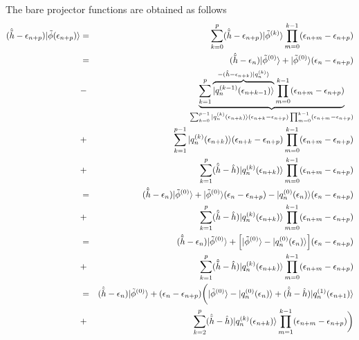 \documentclass[11pt,a4paper]{report}
\begin{document}
The bare projector functions are obtained as follows
\begin{eqnarray}
(\hat{\tilde{h}}-\epsilon_{n+p})
|\tilde{\phi}(\epsilon_{n+p})\rangle
&=&\sum_{k=0}^{p}
(\hat{\tilde{h}}-\epsilon_{n+p})
|\tilde{\phi}^{(k)}\rangle
\prod_{m=0}^{k-1}(\epsilon_{n+m}-\epsilon_{n+p})
\nonumber\\
&=&
(\hat{\tilde{h}}-\epsilon_{n})|\tilde{\phi}^{(0)}\rangle
+|\tilde{\phi}^{(0)}\rangle(\epsilon_n-\epsilon_{n+p})
\nonumber\\
&-&
\underbrace{\sum_{k=1}^{p}
\overbrace{|q_n^{(k-1)}(\epsilon_{n+k-1})\rangle
}^{-(\hat{h}-\epsilon_{n+k})|q_n^{(k)}\rangle}
\prod_{m=0}^{k-1}(\epsilon_{n+m}-\epsilon_{n+p})}
_{
\sum_{k=0}^{p-1}
|q_n^{(k)}(\epsilon_{n+k})\rangle(\epsilon_{n+k}-\epsilon_{n+p})
\prod_{m=0}^{k-1}(\epsilon_{n+m}-\epsilon_{n+p})
}
\nonumber\\
&+&\sum_{k=1}^{p-1}
|q_n^{(k)}(\epsilon_{n+k})\rangle(\epsilon_{n+k}-\epsilon_{n+p})
\prod_{m=0}^{k-1}(\epsilon_{n+m}-\epsilon_{n+p})
\nonumber\\
&+&\sum_{k=1}^{p}
(\hat{\tilde{h}}-\hat{h})
|q_n^{(k)}(\epsilon_{n+k})\rangle
\prod_{m=0}^{k-1}(\epsilon_{n+m}-\epsilon_{n+p})
\nonumber\\
&=&
(\hat{\tilde{h}}-\epsilon_{n})|\tilde{\phi}^{(0)}\rangle
+|\tilde{\phi}^{(0)}\rangle(\epsilon_n-\epsilon_{n+p})
-|q_n^{(0)}(\epsilon_{n})\rangle(\epsilon_{n}-\epsilon_{n+p})
\nonumber\\
&+&\sum_{k=1}^{p}
(\hat{\tilde{h}}-\hat{h})
|q_n^{(k)}(\epsilon_{n+k})\rangle
\prod_{m=0}^{k-1}(\epsilon_{n+m}-\epsilon_{n+p})
\nonumber\\
&=&
(\hat{\tilde{h}}-\epsilon_{n})|\tilde{\phi}^{(0)}\rangle
+
\Bigl[|\tilde{\phi}^{(0)}\rangle-|q_n^{(0)}(\epsilon_{n})\rangle\Bigr]
(\epsilon_n-\epsilon_{n+p})
\nonumber\\
&+&\sum_{k=1}^{p}
(\hat{\tilde{h}}-\hat{h})
|q_n^{(k)}(\epsilon_{n+k})\rangle
\prod_{m=0}^{k-1}(\epsilon_{n+m}-\epsilon_{n+p})
\nonumber\\
&=&
(\hat{\tilde{h}}-\epsilon_{n})|\tilde{\phi}^{(0)}\rangle
+
(\epsilon_n-\epsilon_{n+p})
\biggl(
|\tilde{\phi}^{(0)}\rangle-|q_n^{(0)}(\epsilon_{n})\rangle
+(\hat{\tilde{h}}-\hat{h})
|q_n^{(1)}(\epsilon_{n+1})\rangle
\nonumber\\
&+&\sum_{k=2}^{p}
(\hat{\tilde{h}}-\hat{h})
|q_n^{(k)}(\epsilon_{n+k})\rangle
\prod_{m=1}^{k-1}(\epsilon_{n+m}-\epsilon_{n+p})\biggr)
\end{eqnarray}
\end{document}

